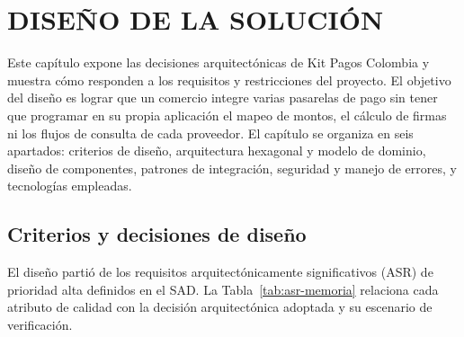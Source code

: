 \setcounter{subsection}{0}
\section{DISEÑO DE LA SOLUCIÓN}

Este capítulo expone las decisiones arquitectónicas de Kit Pagos Colombia y muestra cómo responden a los requisitos y restricciones del proyecto. El objetivo del diseño es lograr que un comercio integre varias pasarelas de pago sin tener que programar en su propia aplicación el mapeo de montos, el cálculo de firmas ni los flujos de consulta de cada proveedor. El capítulo se organiza en seis apartados: criterios de diseño, arquitectura hexagonal y modelo de dominio, diseño de componentes, patrones de integración, seguridad y manejo de errores, y tecnologías empleadas.

\subsection{Criterios y decisiones de diseño}

El diseño partió de los requisitos arquitectónicamente significativos (ASR) de prioridad alta definidos en el SAD. La Tabla~\ref{tab:asr-memoria} relaciona cada atributo de calidad con la decisión arquitectónica adoptada y su escenario de verificación.

